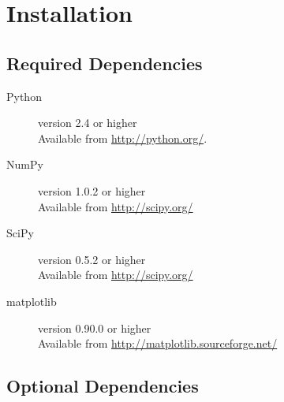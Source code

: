 \documentclass[12pt]{article}
\begin{document}
\section{Installation}\label{sec:user:install}

\subsection{Required Dependencies}
\begin{description}

\item[Python] version 2.4 or higher\\
 Available from \url{http://python.org/}.

\item[NumPy] version 1.0.2 or higher\\
 Available from \url{http://scipy.org/}

\item[SciPy] version 0.5.2 or higher\\
 Available from \url{http://scipy.org/}

\item[matplotlib] version 0.90.0 or higher\\
 Available from \url{http://matplotlib.sourceforge.net/}
\end{description}

\subsection{Optional Dependencies}
\end{document}
